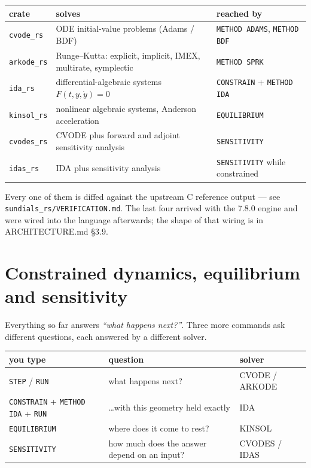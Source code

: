 \documentclass[11pt]{article}
\newcommand{\kw}[1]{\texttt{\uppercase{#1}}}
\newcommand{\code}[1]{\texttt{#1}}
\begin{document}
\begin{center}
\begin{tabular}{p{2.6cm}p{6.6cm}p{4.6cm}}
\textbf{crate} & \textbf{solves} & \textbf{reached by}\\\hline
\code{cvode\_rs}  & ODE initial-value problems (Adams / BDF) & \kw{method adams}, \kw{method bdf}\\
\code{arkode\_rs} & Runge--Kutta: explicit, implicit, IMEX, multirate, symplectic & \kw{method sprk}\\
\code{ida\_rs}    & differential-algebraic systems $F(t,y,\dot y)=0$ & \kw{constrain} + \kw{method ida}\\
\code{kinsol\_rs} & nonlinear algebraic systems, Anderson acceleration & \kw{equilibrium}\\
\code{cvodes\_rs} & CVODE plus forward and adjoint sensitivity analysis & \kw{sensitivity}\\
\code{idas\_rs}   & IDA plus sensitivity analysis & \kw{sensitivity} while constrained\\
\end{tabular}
\end{center}

Every one of them is diffed against the upstream C reference output ---
see \code{sundials\_rs/VERIFICATION.md}. The last four arrived with the
7.8.0 engine and were wired into the language afterwards; the shape of
that wiring is in ARCHITECTURE.md \S3.9.

\section{Constrained dynamics, equilibrium and sensitivity}

Everything so far answers \emph{``what happens next?''}. Three more
commands ask different questions, each answered by a different solver.

\begin{center}
\begin{tabular}{p{5.4cm}p{5.6cm}p{2.8cm}}
\textbf{you type} & \textbf{question} & \textbf{solver}\\\hline
\kw{step} / \kw{run} & what happens next? & CVODE / ARKODE\\
\kw{constrain} + \kw{method ida} + \kw{run} & \dots with this geometry held exactly & IDA\\
\kw{equilibrium} & where does it come to rest? & KINSOL\\
\kw{sensitivity} & how much does the answer depend on an input? & CVODES / IDAS\\
\end{tabular}
\end{center}
\end{document}
